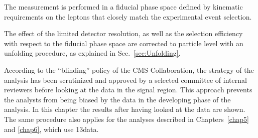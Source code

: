 The measurement is performed in a fiducial phase space defined by kinematic requirements on
the leptons that closely match the experimental event selection.

The effect of the limited detector resolution, as well as the
selection efficiency with respect to the fiducial phase space are corrected to
particle level with an unfolding procedure, as explained in Sec.~\ref{sec:Unfolding}.

According to the ``blinding'' policy of the CMS Collaboration, the strategy of the analysis has been scrutinized and approved by a selected committee of internal reviewers before looking at the data in the signal region. This approach prevents the analysts from being biased by the data in the developing phase of the analysis. In this chapter the results after having looked at the data are shown. The same procedure also applies for the analyses described in Chapters~\ref{chap5} and \ref{chap6}, which use 13\TeV data.








\clearpage

